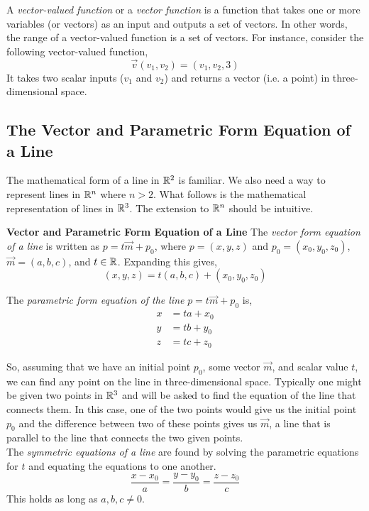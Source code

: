 \documentclass[12pt]{article}
\begin{document}
 A \emph{vector-valued function} or a \emph{vector function} is a function that takes one or more variables (or vectors) as an input and outputs a set of vectors. In other words, the range of a vector-valued function is a set of vectors. For instance, consider the following vector-valued function,
\[
\vec{v}(v_1,v_2) = (v_1,v_2,3)
\]
It takes two scalar inputs ($v_1$ and $v_2$) and returns a vector (i.e. a point) in three-dimensional space. \\

\subsection{The Vector and Parametric Form Equation of a Line}

The mathematical form of a line in $\mathbb{R}^2$ is familiar. We also need a way to represent lines in $\mathbb{R}^n$ where $n>2$. What follows is the mathematical representation of lines in $\mathbb{R}^3$. The extension to $\mathbb{R}^n$ should be intuitive. \\

\begin{framed}
\textbf{Vector and Parametric Form Equation of a Line}
The \emph{vector form equation of a line} is written as $p=t\vec{m}+p_0$, where $p=(x,y,z)$ and $p_0 = (x_0,y_0,z_0)$, $\vec{m} = (a,b,c)$, and $t\in\mathbb{R}$. Expanding this gives,
\[
(x,y,z) = t(a,b,c) + (x_0,y_0,z_0)
\]

The \emph{parametric form equation of the line} $p=t\vec{m}+p_0$ is,
\begin{align*}
x &= ta + x_0 \\
y &= tb + y_0 \\
z &= tc + z_0 
\end{align*}
\end{framed}

So, assuming that we have an initial point $p_0$, some vector $\vec{m}$, and scalar value $t$, we can find any point on the line in three-dimensional space. Typically one might be given two points in $\mathbb{R}^3$ and will be asked to find the equation of the line that connects them. In this case, one of the two points would give us the initial point $p_0$ and the difference between two of these points gives us $\vec{m}$, a line that is parallel to the line that connects the two given points. \\

 The \emph{symmetric equations of a line} are found by solving the parametric equations for $t$ and equating the equations to one another. 
\[
\frac{x-x_0}{a}=\frac{y-y_0}{b}=\frac{z-z_0}{c}
\]
This holds as long as $a,b,c\neq0$.\\
\end{document}

